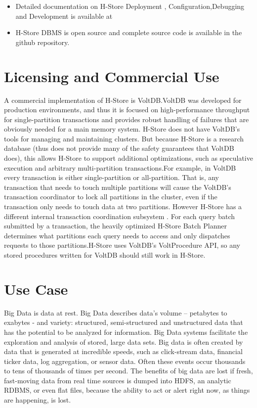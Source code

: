 \documentclass[9pt,twocolumn,twoside]{styles/osajnl}
\begin{document}
\begin{itemize}
\renewcommand{\labelitemi}{\scriptsize$\bullet$} 
\item Detailed documentation on H-Store  Deployment , Configuration,Debugging and Development is available at  \cite{www-H-Store}
\item H-Store DBMS is open source and complete source code is available in the  \cite{github-H-Store} github repository. 
\end{itemize}

\section{Licensing and Commercial Use}

A commercial implementation of H-Store is VoltDB.VoltDB was developed for production environments, and thus it is focused on high-performance throughput for single-partition transactions and provides robust handling of failures that are obviously needed for a main memory system. H-Store does not have VoltDB’s tools for managing and maintaining clusters. But because H-Store is a research database (thus does not provide many of the safety guarantees that VoltDB does), this allows H-Store to support additional optimizations, such as speculative execution and arbitrary multi-partition transactions.For example, in VoltDB every transaction is either single-partition or all-partition. That is, any transaction that needs to touch multiple partitions will cause the VoltDB’s transaction coordinator to lock all partitions in the cluster, even if the transaction only needs to touch data at two partitions. However H-Store has a different internal transaction coordination subsystem . For each query batch submitted by a transaction, the heavily optimized H-Store Batch Planner determines what partitions each query needs to access and only dispatches requests to those partitions.H-Store uses VoltDB’s VoltProcedure API, so any stored procedures written for VoltDB should still work in H-Store\cite{www-H-StoreFaq}. 


\section{Use Case}

Big Data is data at rest. Big Data describes data’s volume – petabytes to exabytes - and variety: structured, semi-structured and unstructured data that has the potential to be analyzed for information. Big Data systems facilitate the exploration and analysis of stored, large data sets.
Big data is often created by data that is generated at incredible speeds, such as click-stream data, financial ticker data, log aggregation, or sensor data. Often these events occur thousands to tens of thousands of times per second. The benefits of big data are lost if fresh, fast-moving data from real time sources is dumped into HDFS, an analytic RDBMS, or even flat files, because the ability to act or alert right now, as things are happening, is lost. 
\end{document}

